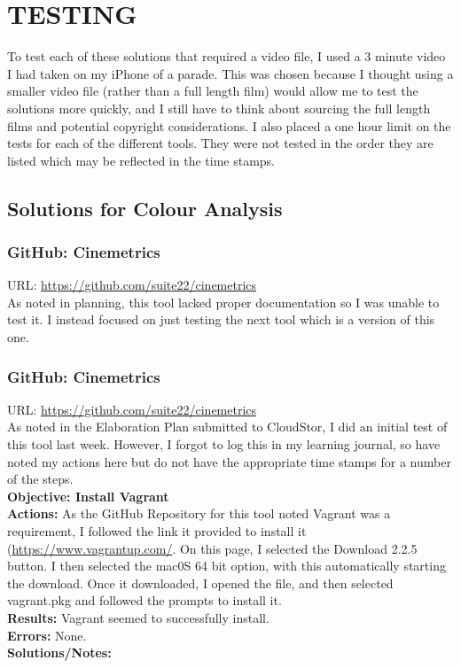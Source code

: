\documentclass{article}
\begin{document}
\pagebreak

\section{TESTING}

To test each of these solutions that required a video file, I used a 3 minute video I had taken on my iPhone of a parade. This was chosen because I thought using a smaller video file (rather than a full length film) would allow me to test the solutions more quickly, and I still have to think about sourcing the full length films and potential copyright considerations. I also placed a one hour limit on the tests for each of the different tools. They were not tested in the order they are listed which may be reflected in the time stamps.

\subsection{Solutions for Colour Analysis}

\subsubsection{GitHub: Cinemetrics}
URL: \url{https://github.com/suite22/cinemetrics}\\

As noted in planning, this tool lacked proper documentation so I was unable to test it. I instead focused on just testing the next tool which is a version of this one.

\subsubsection{GitHub: Cinemetrics}
URL: \url{https://github.com/suite22/cinemetrics}\\

As noted in the Elaboration Plan submitted to CloudStor, I did an initial test of this tool last week. However, I forgot to log this in my learning journal, so have noted my actions here but do not have the appropriate time stamps for a number of the steps.\\

\textbf{Objective: Install Vagrant}\\
\textbf{Actions:} As the GitHub Repository for this tool noted Vagrant was a requirement, I followed the link it provided to install it (\url{https://www.vagrantup.com/}. On this page, I selected the Download 2.2.5 button. I then selected the mac0S 64 bit option, with this automatically starting the download. Once it downloaded, I opened the file, and then selected vagrant.pkg and followed the prompts to install it.  \\
\textbf{Results:} Vagrant seemed to successfully install.\\
\textbf{Errors:} None.\\
\textbf{Solutions/Notes:}\\
\end{document}
